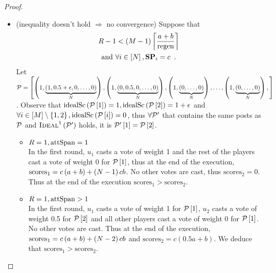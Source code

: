 \begin{proof}
\begin{itemize}
    \item (inequality doesn't hold $\Rightarrow$ no convergence) Suppose that
    \begin{gather}
      \label{conv:proof:fewrounds}
      \rounds - 1 < \left(\postlen - 1\right)\ceil*{\frac{a+b}{\regen}} \\
      \text{and } \forall i \in \left[\playerlen\right], \stpowvec_i = c
      \enspace. \nonumber
    \end{gather}
    Let $\mathcal{P} = \left[\left(1, \underbrace{\left(1, 0.5 + \epsilon, 0,
    \dots, 0\right)}_{N}\right), \left(1, \underbrace{\left(0, 0.5, 0,
    \dots, 0\right)}_{N}\right), \left(1, \underbrace{\left(0, \dots,
    0\right)}_{N}\right), \dots, \left(1, \underbrace{\left(0, \dots,
    0\right)}_{N}\right), \right]$. Observe that
    $\mathrm{idealSc}\left(\mathcal{P}\left[1\right]\right) = 1, \mathrm{idealSc}\left(\mathcal{P}\left[2\right]\right) = 1 +
    \epsilon$ and $\forall i \in \left[M\right] \setminus \left\{1,
    2\right\}, \mathrm{idealSc}\left(\mathcal{P}\left[i\right]\right) = 0$, thus $\forall \mathcal{P}'$
    that contains the same posts as $\mathcal{P}$ and
    $\textsc{Ideal}^1\left(\mathcal{P}'\right)$ holds, it is
    $\mathcal{P}'\left[1\right] = \mathcal{P}\left[2\right]$.

    \begin{itemize}
      \item $R = 1, \mathrm{attSpan} = 1$ \\
      In the first round, $u_1$ casts a vote of weight 1 and the rest of the
      players cast a vote of weight 0 for $\mathcal{P}\left[1\right]$, thus at the
      end of the execution, $\mathrm{scores}_1 = c \left(a + b\right) +
      \left(N - 1\right) c b$. No other votes are cast, thus
      $\mathrm{scores}_2 = 0$. Thus at the end of the execution
      $\mathrm{scores}_1 > \mathrm{scores}_2$.

      \item $R = 1, \mathrm{attSpan} > 1$ \\
      In the first round, $u_1$ casts a vote of weight 1 for
      $\mathcal{P}\left[1\right]$, $u_2$ casts a vote of weight 0.5 for
      $\mathcal{P}\left[2\right]$ and all other players cast a vote of weight 0
      for $\mathcal{P}\left[1\right]$. No other votes are cast. Thus at the end of
      the execution, $\mathrm{scores}_1 = c\left(a + b\right) + \left(N
      - 2\right) c b$ and $\mathrm{scores}_2 = c\left(0.5a + b\right)$. We
      deduce that $\mathrm{scores}_1 > \mathrm{scores}_2$.


\end{itemize}
\end{itemize}
\end{proof}
